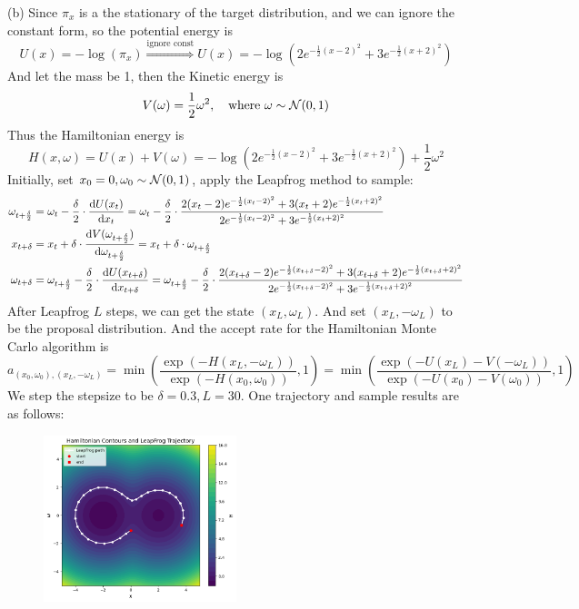 \begin{homeworkProblem}
(b) Since $\pi_x$ is a the stationary of the target distribution, and we can ignore the constant form, so the potential energy is
$$U(x)=-\log(\pi_x) \stackrel{\text{ignore const}}{\Rightarrow} U(x)= -\log\left(2e^{-\frac{1}{2}(x-2)^2} + 3e^{-\frac{1}{2}(x+2)^2}\right)$$
And let the mass be 1, then the Kinetic energy is
$$V(\omega)=\dfrac{1}{2}\omega^2, \quad\text{where } \omega\sim\mathcal{N}(0,1)$$
Thus the Hamiltonian energy is
$$H(x,\omega)=U(x)+V(\omega)= -\log\left(2e^{-\frac{1}{2}(x-2)^2} + 3e^{-\frac{1}{2}(x+2)^2}\right)+\dfrac{1}{2}\omega^2$$
Initially, set $x_0=0, \omega_0\sim\mathcal{N}(0,1)$, apply the Leapfrog method to sample:
\begin{align*}
\omega_{t+\frac{\delta}{2}} &= \omega_t - \frac{\delta}{2}\cdot \dfrac{\mathrm{d}U(x_t)}{\mathrm{d}x_t} = \omega_t - \frac{\delta}{2}\cdot \dfrac{2(x_t-2)e^{-\frac{1}{2}(x_t-2)^2}+3(x_t+2)e^{-\frac{1}{2}(x_t+2)^2}}{2e^{-\frac{1}{2}(x_t-2)^2}+3e^{-\frac{1}{2}(x_t+2)^2}} \\
x_{t+\delta} &= x_t + \delta \cdot \dfrac{\mathrm{d}V(\omega_{t+\frac{\delta}{2}})}{\mathrm{d}\omega_{t+\frac{\delta}{2}}} = x_t + \delta\cdot \omega_{t+\frac{\delta}{2}} \\
\omega_{t+\delta} &= \omega_{t+\frac{\delta}{2}} - \frac{\delta}{2}\cdot \dfrac{\mathrm{d}U(x_{t+\delta})}{\mathrm{d}x_{t+\delta}} = \omega_{t+\frac{\delta}{2}} - \frac{\delta}{2}\cdot \dfrac{2(x_{t+\delta}-2)e^{-\frac{1}{2}(x_{t+\delta}-2)^2}+3(x_{t+\delta}+2)e^{-\frac{1}{2}(x_{t+\delta}+2)^2}}{2e^{-\frac{1}{2}(x_{t+\delta}-2)^2}+3e^{-\frac{1}{2}(x_{t+\delta}+2)^2}}
\end{align*}
After Leapfrog $L$ steps, we can get the state $(x_L, \omega_L)$. And set $(x_L, -\omega_L)$ to be the proposal distribution. And the accept rate for the Hamiltonian Monte Carlo algorithm is
$$a_{(x_0,\omega_0),(x_L,-\omega_L)}=\min\left(\dfrac{\exp\left(-H(x_L,-\omega_L)\right)}{\exp\left(-H(x_0,\omega_0)\right)}, 1\right)=\min\left(\dfrac{\exp\left(-U(x_L)-V(-\omega_L)\right)}{\exp\left(-U(x_0)-V(\omega_0)\right)}, 1\right)$$
We step the stepsize to be $\delta=0.3, L=30$. One trajectory and sample results are as follows:
\begin{figure}[h]
    \centering
    \includegraphics[width=0.5\textwidth]{./figure/p11/trajectory.png}

\end{figure}
\end{homeworkProblem}
